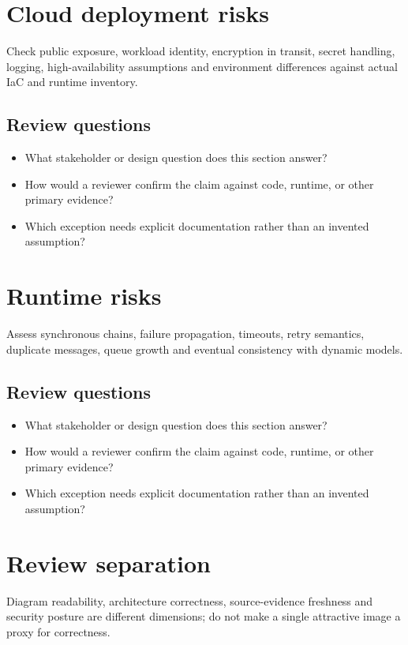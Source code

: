 \documentclass[10pt,letterpaper]{article}
\begin{document}
\section{Cloud deployment risks}
Check public exposure, workload identity, encryption in transit, secret handling, logging, high-availability assumptions and environment differences against actual IaC and runtime inventory.


\subsection{Review questions}
\begin{itemize}
\item What stakeholder or design question does this section answer?
\item How would a reviewer confirm the claim against code, runtime, or other primary evidence?
\item Which exception needs explicit documentation rather than an invented assumption?
\end{itemize}

\section{Runtime risks}
Assess synchronous chains, failure propagation, timeouts, retry semantics, duplicate messages, queue growth and eventual consistency with dynamic models.


\subsection{Review questions}
\begin{itemize}
\item What stakeholder or design question does this section answer?
\item How would a reviewer confirm the claim against code, runtime, or other primary evidence?
\item Which exception needs explicit documentation rather than an invented assumption?
\end{itemize}

\section{Review separation}
Diagram readability, architecture correctness, source-evidence freshness and security posture are different dimensions; do not make a single attractive image a proxy for correctness.
\end{document}
